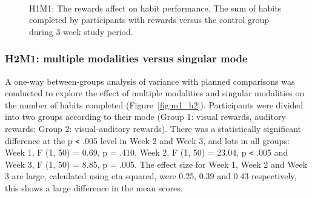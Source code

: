 \begin{figure}[H]
\centering
  \caption{H1M1: The rewards affect on habit performance. The sum of habits completed by participants with rewards versus the control group during 3-week study period.}~\label{fig:m1_h1}
\end{figure}

\subsubsection*{H2M1: multiple modalities versus singular mode}
A one-way between-groups analysis of variance with planned comparisons was conducted to explore the effect of multiple modalities and singular modalities on the number of habits completed (Figure~\ref{fig:m1_h2}). Participants were divided into two groups according to their mode (Group 1: visual rewards, auditory rewards; Group 2: visual-auditory rewards). There was a statistically significant difference at the p \verb|<| .005 level in Week 2 and Week 3, and lots in all groups: Week 1, F (1, 50) = 0.69, p = .410, Week 2, F (1, 50) = 23.04, p \verb|<| .005 and Week 3, F (1, 50) = 8.85, p = .005. The effect size for Week 1, Week 2 and Week 3 are large, calculated using eta squared, were 0.25, 0.39 and 0.43 respectively, this shows a large difference in the mean scores.


